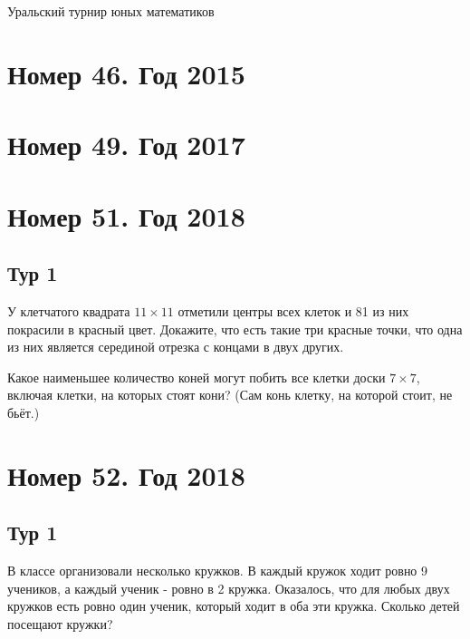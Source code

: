 \documentclass[11pt, a4paper]{problems_template}
\begin{document}
\begin{titlepage}
  \begin{center}
	\Huge{Уральский турнир юных математиков}
  \end{center}
\end{titlepage}

\chapter{Номер 46. Год 2015}


\chapter{Номер 49. Год 2017}

\chapter{Номер 51. Год 2018}

\section{Тур 1}

\begin{exercise}
У клетчатого квадрата $11 \times 11$ отметили центры всех клеток и 81 из них покрасили в красный цвет. Докажите, что есть такие три красные точки, что одна из них является серединой отрезка с концами в двух других.
\end{exercise}

\begin{exercise}
Какое наименьшее количество коней могут побить все клетки доски $7 \times 7$, включая клетки, на которых стоят кони? (Сам конь клетку, на которой стоит, не бьёт.)
\end{exercise}

\chapter{Номер 52. Год 2018}

\section{Тур 1}

\begin{exercise}
В классе организовали несколько кружков. В каждый кружок ходит ровно 9 учеников, а каждый ученик - ровно в 2 кружка. Оказалось, что для любых двух кружков есть ровно один ученик, который ходит в оба эти кружка. Сколько детей посещают кружки?
\end{exercise}
\end{document}
